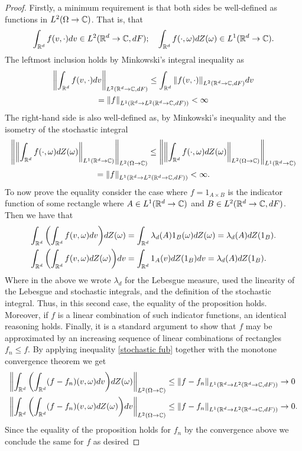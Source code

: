 \documentclass[12pt]{article}
\begin{document}
\begin{proof}
    Firstly, a minimum requirement is that both sides be well-defined as functions in $L^2(\Omega\to\mathbb{C})$. That is, that
    \begin{equation*}
        \int_{{\mathbb R}^d}f(v,\cdot)dv\in L^2({\mathbb R}^d\to\mathbb{C},dF);\quad   \int_{{\mathbb R}^d}f(\cdot,\omega)dZ(\omega)\in L^1({\mathbb R}^d\to\mathbb{C}).
    \end{equation*}
    The leftmost inclusion holds by Minkowski's integral inequality as
    \begin{multline*}
        \norm{\int_{{\mathbb R}^d}f(v,\cdot)dv}_{L^2({\mathbb R}^d\to\mathbb{C},dF)}\leq\int_{{\mathbb R}^d}\norm{f(v,\cdot)}_{L^2({\mathbb R}^d\to\mathbb{C},dF)}dv\\=\norm{f}_{L^1({\mathbb R}^d\to L^2({\mathbb R}^d\to\mathbb{C},dF))}<\infty
    \end{multline*}
    The right-hand side is also well-defined as, by Minkowski's inequality and the isometry of the stochastic integral
    \begin{multline}\label{stochastic fub}
        \norm{\norm{\int_{{\mathbb R}^d}f(\cdot,\omega)dZ(\omega)}_{L^1({\mathbb R}^d\to\mathbb{C})}}_{L^2(\Omega\to\mathbb{C})}\leq \norm{\norm{\int_{{\mathbb R}^d}f(\cdot,\omega)dZ(\omega)}_{L^2(\Omega\to\mathbb{C})}}_{L^1({\mathbb R}^d\to\mathbb{C})}\\=\norm{f}_{L^1({\mathbb R}^d\to L^2({\mathbb R}^d\to\mathbb{C},dF))}<\infty.
    \end{multline}
    To now prove the equality consider the case where $f=1_{A\times B}$ is the indicator function of some rectangle where $A\in L^1({\mathbb R}^d\to\mathbb{C})$ and $B\in L^2({\mathbb R}^d\to\mathbb{C},dF)$. Then we have that
    \begin{align*}
        \int_{{\mathbb R}^d}\qty(\int_{{\mathbb R}^d}f(v,\omega)dv)dZ(\omega) & =\int_{{\mathbb R}^d}\lambda_d(A)1_B(\omega) dZ(\omega)=\lambda_d(A)dZ(1_B). \\
        \int_{{\mathbb R}^d}\qty(\int_{{\mathbb R}^d}f(v,\omega)dZ(\omega))dv & = \int_{{\mathbb R}^d}1_A(v)dZ(1_B)dv=\lambda_d(A)dZ(1_B).
    \end{align*}
    Where in the above we wrote $\lambda_d$ for the Lebesgue measure, used the linearity of the Lebesgue and stochastic integrals, and the definition of the stochastic integral. Thus, in this second case, the equality of the proposition holds. Moreover, if $f$ is a linear combination of such indicator functions, an identical reasoning holds. Finally, it is a standard argument to show that $f$ may be approximated by an increasing sequence of linear combinations of rectangles  $f_n\leq f$. By applying inequality \eqref{stochastic fub} together with the monotone convergence theorem we get
    \begin{align*}
        \norm{\int_{{\mathbb R}^d}\qty(\int_{{\mathbb R}^d}(f-f_n)(v,\omega)dv)dZ(\omega)}_{L^2(\Omega\to\mathbb{C})} & \leq\norm{f-f_n}_{L^1({\mathbb R}^d\to L^2({\mathbb R}^d\to\mathbb{C},dF))}\to 0 \\\norm{\int_{{\mathbb R}^d}\qty(\int_{{\mathbb R}^d}(f-f_n)(v,\omega)dZ(\omega))dv}_{L^2(\Omega\to\mathbb{C})}&\leq\norm{f-f_n}_{L^1({\mathbb R}^d\to L^2({\mathbb R}^d\to\mathbb{C},dF))}\to 0.
    \end{align*}
    Since the equality of the proposition holds for $f_n$ by the convergence above we conclude the same for  $f$ as desired
\end{proof}
\end{document}

